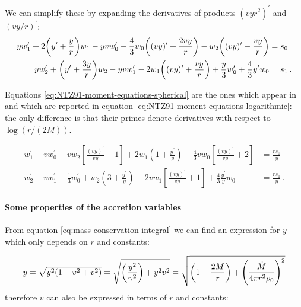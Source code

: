 \documentclass[main.tex]{subfiles}
\begin{document}
We can simplify these by expanding the derivatives of products \((vyr^2)^{\prime}\) and \((vy/r)^{\prime}\):
\begin{subequations} \label{eq:NTZ91-moment-equations-spherical}
\begin{align}
  y w_1^{\prime} + 2 \qty(y^{\prime} + \frac{y}{r}) w_1
  -yv w_0^{\prime}
  - \frac{4}{3} w_0 \qty((v y)^{\prime} + \frac{2vy}{r})
  - w_2 \qty((vy)^{\prime} - \frac{vy}{r}) &= s_0  \\
  y w_2^{\prime} + \qty(y^{\prime} + \frac{3y}{r})w_2
  - yv w_1 ^{\prime}
  - 2 w_1 \qty((vy)' + \frac{vy}{r})
  + \frac{y}{3} w_0^{\prime} + \frac{4}{3} y^{\prime} w_0
  &= s_1\,.
\end{align}
\end{subequations}

Equations \eqref{eq:NTZ91-moment-equations-spherical} are the ones which appear in  \textcite[eq. 4]{NobiliTurollaZampieri:1991dec} and which are reported in equation \eqref{eq:NTZ91-moment-equations-logarithmic}: the only difference is that their primes denote derivatives with respect to \(\log (r / (2M))\).

\begin{subequations} \label{eq:NTZ91-moment-equations-logarithmic}
    \begin{align}
        w_{1}^{\prime}-v w_{0}^{\prime}
        -v w_{2}\left[\frac{(v y)^{\prime}}{v y}-1\right]
        +2 w_{1}\left(1+\frac{y^{\prime}}{y}\right)
        -\frac{4}{3} v w_{0}\left[\frac{(v y)^{\prime}}{v y}+2\right]&=\frac{r s_{0}}{y} \\
        w_{2}^{\prime}-v w_{1}^{\prime}+\frac{1}{3} w_{0}^{\prime} +w_{2}\left(3+\frac{y^{\prime}}{y}\right)-2 v w_{1}\left[\frac{(v y)^{\prime}}{v y}+1\right]+\frac{4}{3} \frac{y^{\prime}}{y} w_{0} &=\frac{r s_{1}}{y}\,.
    \end{align}
\end{subequations}

\paragraph{Some properties of the accretion variables}

From equation \eqref{eq:mass-conservation-integral} we can find an expression \cite[eq. 18a]{ThorneFLammmangZytkow:1981feb} for \(y\) which only depends on \(r\) and constants:

\begin{equation}
  y = \sqrt{y^2 \qty(1 - v^2 + v^2)}
  = \sqrt{\qty(\frac{y^2}{\gamma^2}) + y^2 v^2}
  = \sqrt{\qty(1 - \frac{2M}{r}) + \qty(\frac{\dot{M}}{4 \pi r^2 \rho_0})^2}
\end{equation}
therefore \(v\) can also be expressed in terms of \(r\) and constants:
\end{document}
